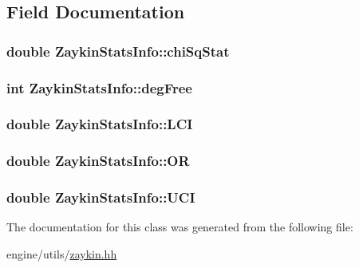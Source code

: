 \subsection{Field Documentation}
\hypertarget{classZaykinStatsInfo_a28b66e969cdfd1f819ab622993aeea62}{
\subsubsection[{chiSqStat}]{\setlength{\rightskip}{0pt plus 5cm}double {\bf ZaykinStatsInfo::chiSqStat}}}
\label{classZaykinStatsInfo_a28b66e969cdfd1f819ab622993aeea62}
\hypertarget{classZaykinStatsInfo_aab543cdaa2227c8eda01598259bd0497}{
\subsubsection[{degFree}]{\setlength{\rightskip}{0pt plus 5cm}int {\bf ZaykinStatsInfo::degFree}}}
\label{classZaykinStatsInfo_aab543cdaa2227c8eda01598259bd0497}
\hypertarget{classZaykinStatsInfo_a427af93fef8a99a23312fc42b14b85ae}{
\subsubsection[{LCI}]{\setlength{\rightskip}{0pt plus 5cm}double {\bf ZaykinStatsInfo::LCI}}}
\label{classZaykinStatsInfo_a427af93fef8a99a23312fc42b14b85ae}
\hypertarget{classZaykinStatsInfo_a75784cfcc143155568b6877fafe7c4a6}{
\subsubsection[{OR}]{\setlength{\rightskip}{0pt plus 5cm}double {\bf ZaykinStatsInfo::OR}}}
\label{classZaykinStatsInfo_a75784cfcc143155568b6877fafe7c4a6}
\hypertarget{classZaykinStatsInfo_ae32b8c048ddaddd014e5cb33943a3167}{
\subsubsection[{UCI}]{\setlength{\rightskip}{0pt plus 5cm}double {\bf ZaykinStatsInfo::UCI}}}
\label{classZaykinStatsInfo_ae32b8c048ddaddd014e5cb33943a3167}


The documentation for this class was generated from the following file:\begin{DoxyCompactItemize}
\item 
engine/utils/\hyperlink{zaykin_8hh}{zaykin.hh}\end{DoxyCompactItemize}
